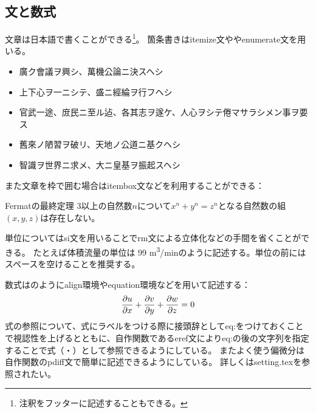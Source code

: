 \documentclass[uplatex]{jsarticle}
\begin{document}
\subsection{文と数式}
文章は日本語で書くことができる\footnote{注釈をフッターに記述することもできる。}。
箇条書きはitemize文ややenumerate文を用いる。
\begin{itemize}
	\item 廣ク會議ヲ興シ、萬機公󠄁論ニ決スヘシ
	\item 上下心ヲ一ニシテ、盛󠄁ニ經綸ヲ行フヘシ
	\item 官武一途󠄁、庻民ニ至ル迠、各其志ヲ遂󠄂ケ、人心ヲシテ倦マサラシメン事ヲ要󠄁ス
	\item 舊來ノ陋習󠄁ヲ破リ、天地ノ公󠄁道󠄁ニ基クヘシ
	\item 智識ヲ世界ニ求メ、大ニ皇基ヲ振起󠄁スヘシ
\end{itemize}
また文章を枠で囲む場合はitembox文などを利用することができる\cite{itembox}：
\begin{itembox}[l]{Fermatの最終定理}
3以上の自然数$n$について$x^n+y^n=z^n$となる自然数の組$(x,y,z)$は存在しない。
\end{itembox}
単位についてはsi文を用いることでrm文による立体化などの手間を省くことができる。
たとえば体積流量の単位は 99 \si{m^3/min}のように記述する。単位の前にはスペースを空けることを推奨する。
\par
数式はのようにalign環境やequation環境などを用いて記述する：
\begin{align}
	\pdiff{1}{u}{x} + \pdiff{1}{v}{y} + \pdiff{1}{w}{z} = 0
	\label{eq:mass-conservation}
\end{align}
式の参照について、式にラベルをつける際に接頭辞としてeq:をつけておくことで視認性を上げるとともに、自作関数であるeref文によりeq:の後の文字列を指定することで式（・）として参照できるようにしている。
またよく使う偏微分は自作関数のpdiff文で簡単に記述できるようにしている。
詳しくはsetting.texを参照されたい。
\end{document}
